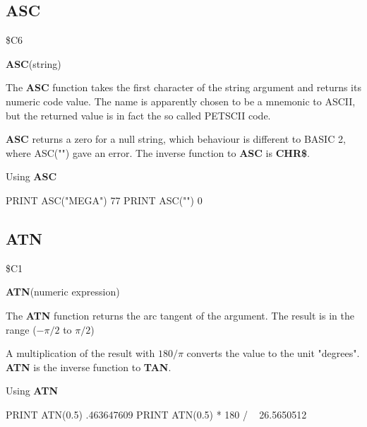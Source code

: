 \subsection{ASC}
\begin{description}[leftmargin=3cm,style=nextline]
\item [Token:] \$C6
\item [Format:] {\bf ASC}(string)
\item [Usage:] The {\bf ASC} function takes the first character of
               the string argument and returns its numeric code value.
               The name is apparently chosen to be a mnemonic to ASCII,
               but the returned value is in fact the so called PETSCII code.
\item [Remarks:]
               {\bf ASC} returns a zero for a null string, which behaviour
               is different to BASIC 2, where ASC("") gave an error.
               The inverse function to {\bf ASC} is {\bf CHR\$}.
\item [Example:] Using {\bf ASC}
\begin{screenoutput}
  PRINT ASC("MEGA")
  77
  PRINT ASC("")
  0
\end{screenoutput}
\end{description}


\newpage
\subsection{ATN}
\begin{description}[leftmargin=3cm,style=nextline]
\item [Token:] \$C1
\item [Format:] {\bf ATN}(numeric expression)
\item [Usage:] The {\bf ATN} function returns the arc tangent of the
               argument.
               The result is in the range ($-\pi/2$ to $\pi/2$)

\item [Remarks:]
               A multiplication of the result with $180/\pi$
               converts the value to the unit "degrees".
               {\bf ATN} is the inverse function to {\bf TAN}.
\item [Example:] Using {\bf ATN}
\begin{screenoutput}
  PRINT ATN(0.5)
   .463647609
  PRINT ATN(0.5) * 180 / ~
   26.5650512
\end{screenoutput}
\end{description}

